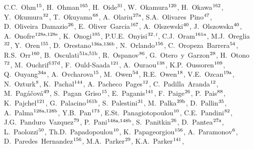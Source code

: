 \begin{flushleft}
C.C.~Ohm$^\textrm{\scriptsize 15}$,
H.~Ohman$^\textrm{\scriptsize 165}$,
H.~Oide$^\textrm{\scriptsize 31}$,
W.~Okamura$^\textrm{\scriptsize 120}$,
H.~Okawa$^\textrm{\scriptsize 162}$,
Y.~Okumura$^\textrm{\scriptsize 32}$,
T.~Okuyama$^\textrm{\scriptsize 68}$,
A.~Olariu$^\textrm{\scriptsize 27a}$,
S.A.~Olivares~Pino$^\textrm{\scriptsize 47}$,
D.~Oliveira~Damazio$^\textrm{\scriptsize 26}$,
E.~Oliver~Garcia$^\textrm{\scriptsize 167}$,
A.~Olszewski$^\textrm{\scriptsize 40}$,
J.~Olszowska$^\textrm{\scriptsize 40}$,
A.~Onofre$^\textrm{\scriptsize 128a,128e}$,
K.~Onogi$^\textrm{\scriptsize 105}$,
P.U.E.~Onyisi$^\textrm{\scriptsize 32}$$^{,t}$,
C.J.~Oram$^\textrm{\scriptsize 161a}$,
M.J.~Oreglia$^\textrm{\scriptsize 32}$,
Y.~Oren$^\textrm{\scriptsize 155}$,
D.~Orestano$^\textrm{\scriptsize 136a,136b}$,
N.~Orlando$^\textrm{\scriptsize 156}$,
C.~Oropeza~Barrera$^\textrm{\scriptsize 54}$,
R.S.~Orr$^\textrm{\scriptsize 160}$,
B.~Osculati$^\textrm{\scriptsize 51a,51b}$,
R.~Ospanov$^\textrm{\scriptsize 86}$,
G.~Otero~y~Garzon$^\textrm{\scriptsize 28}$,
H.~Otono$^\textrm{\scriptsize 72}$,
M.~Ouchrif$^\textrm{\scriptsize 137d}$,
F.~Ould-Saada$^\textrm{\scriptsize 121}$,
A.~Ouraou$^\textrm{\scriptsize 138}$,
K.P.~Oussoren$^\textrm{\scriptsize 109}$,
Q.~Ouyang$^\textrm{\scriptsize 34a}$,
A.~Ovcharova$^\textrm{\scriptsize 15}$,
M.~Owen$^\textrm{\scriptsize 54}$,
R.E.~Owen$^\textrm{\scriptsize 18}$,
V.E.~Ozcan$^\textrm{\scriptsize 19a}$,
N.~Ozturk$^\textrm{\scriptsize 8}$,
K.~Pachal$^\textrm{\scriptsize 144}$,
A.~Pacheco~Pages$^\textrm{\scriptsize 12}$,
C.~Padilla~Aranda$^\textrm{\scriptsize 12}$,
M.~Pag\'{a}\v{c}ov\'{a}$^\textrm{\scriptsize 49}$,
S.~Pagan~Griso$^\textrm{\scriptsize 15}$,
E.~Paganis$^\textrm{\scriptsize 141}$,
F.~Paige$^\textrm{\scriptsize 26}$,
P.~Pais$^\textrm{\scriptsize 88}$,
K.~Pajchel$^\textrm{\scriptsize 121}$,
G.~Palacino$^\textrm{\scriptsize 161b}$,
S.~Palestini$^\textrm{\scriptsize 31}$,
M.~Palka$^\textrm{\scriptsize 39b}$,
D.~Pallin$^\textrm{\scriptsize 35}$,
A.~Palma$^\textrm{\scriptsize 128a,128b}$,
Y.B.~Pan$^\textrm{\scriptsize 173}$,
E.St.~Panagiotopoulou$^\textrm{\scriptsize 10}$,
C.E.~Pandini$^\textrm{\scriptsize 82}$,
J.G.~Panduro~Vazquez$^\textrm{\scriptsize 79}$,
P.~Pani$^\textrm{\scriptsize 148a,148b}$,
S.~Panitkin$^\textrm{\scriptsize 26}$,
D.~Pantea$^\textrm{\scriptsize 27a}$,
L.~Paolozzi$^\textrm{\scriptsize 50}$,
Th.D.~Papadopoulou$^\textrm{\scriptsize 10}$,
K.~Papageorgiou$^\textrm{\scriptsize 156}$,
A.~Paramonov$^\textrm{\scriptsize 6}$,
D.~Paredes~Hernandez$^\textrm{\scriptsize 156}$,
M.A.~Parker$^\textrm{\scriptsize 29}$,
K.A.~Parker$^\textrm{\scriptsize 141}$,
$$
\end{flushleft}
